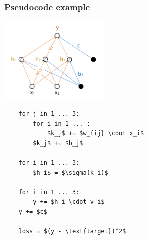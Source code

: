 \documentclass[12pt]{article}
\begin{document}
\subsubsection*{Pseudocode example}
\begin{multicols}{2}
    
    \includegraphics[width=0.4\textwidth]{assets/FNN.png}

    \columnbreak

    \begin{lstlisting}
    for j in 1 ... 3: 
        for i in 1 ... :
            $k_j$ += $w_{ij} \cdot x_i$
        $k_j$ += $b_j$

    for i in 1 ... 3:
        $h_i$ = $\sigma(k_i)$

    for i in 1 ... 3:
        y += $h_i \cdot v_i$
    y += $c$

    loss = $(y - \text{target})^2$
    \end{lstlisting}
\end{multicols}
\end{document}
